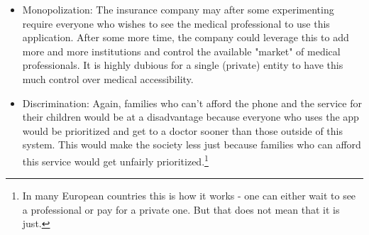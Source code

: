 \documentclass[a4paper, 11pt]{article}
\begin{document}
\begin{enumerate}[a)]
\begin{itemize}
    \item Monopolization:
    The insurance company may after some experimenting require everyone who wishes to see the medical professional to use this application.
    After some more time, the company could leverage this to add more and more institutions and control the available "market" of medical professionals.
    It is highly dubious for a single (private) entity to have this much control over medical accessibility.
    
    \item Discrimination:
    Again, families who can't afford the phone and the service for their children would be at a disadvantage because everyone who uses the app would be prioritized and get to a doctor sooner than those outside of this system.
    This would make the society less just because families who can afford this service would get unfairly prioritized.\footnote{In many European countries this is how it works - one can either wait to see a professional or pay for a private one. But that does not mean that it is just.}
    \end{itemize}
\end{enumerate}

\end{document}
